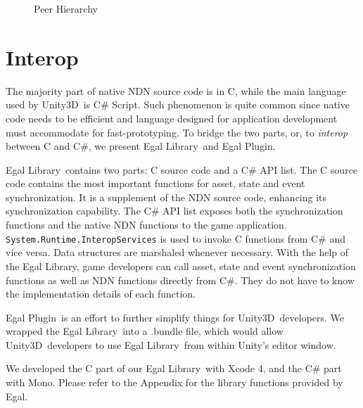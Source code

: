 \begin{figure}
\begin{center}
\caption{Peer Hierarchy}
\label{hierarchy}
\end{center}
\end{figure}



\section{Interop}

The majority part of native NDN source code is in C, while the main language used by Unity3D\tm~is C\# Script. Such phenomenon is quite common since native code needs to be efficient and language designed for application development must accommodate for fast-prototyping. To bridge the two parts, or, to \emph{interop} between C and C\#, we present Egal Library\tm~and Egal Plugin\tm.

Egal Library\tm~contains two parts: C source code and a C\# API list. The C source code contains the most important functions for asset, state and event synchronization. It is a supplement of the NDN source code, enhancing its synchronization capability. The C\# API list exposes both the synchronization functions and the native NDN functions to the game application. \verb|System.Runtime.InteropServices| is used to invoke C functions from C\# and vice versa. Data structures are marshaled whenever necessary. With the help of the Egal Library\tm, game developers can call asset, state and event synchronization functions as well as NDN functions directly from C\#. They do not have to know the implementation details of each function. 

Egal Plugin\tm~is an effort to further simplify things for Unity3D\tm~developers. We wrapped the Egal Library\tm~into a .bundle file, which would allow Unity3D\tm~developers to use Egal Library\tm~from within Unity\tm 's editor window.

We developed the C part of our Egal Library\tm~with Xcode 4\tm, and the C\# part with Mono\tm. Please refer to the Appendix for the library functions provided by Egal\tm.




















